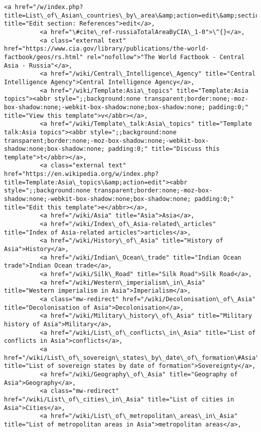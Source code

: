 \documentclass[11pt]{article}
\begin{document}
\begin{Verbatim}[commandchars=\\\{\}]
          <a href="/w/index.php?title=List\_of\_Asian\_countries\_by\_area\&amp;action=edit\&amp;section=2" title="Edit section: References">edit</a>,
          <a href="\#cite\_ref-russiaTotalAreaByCIA\_1-0">\^{}</a>,
          <a class="external text" href="https://www.cia.gov/library/publications/the-world-factbook/geos/rs.html" rel="nofollow">"The World Factbook - Central Asia - Russia"</a>,
          <a href="/wiki/Central\_Intelligence\_Agency" title="Central Intelligence Agency">Central Intelligence Agency</a>,
          <a href="/wiki/Template:Asia\_topics" title="Template:Asia topics"><abbr style=";;background:none transparent;border:none;-moz-box-shadow:none;-webkit-box-shadow:none;box-shadow:none; padding:0;" title="View this template">v</abbr></a>,
          <a href="/wiki/Template\_talk:Asia\_topics" title="Template talk:Asia topics"><abbr style=";;background:none transparent;border:none;-moz-box-shadow:none;-webkit-box-shadow:none;box-shadow:none; padding:0;" title="Discuss this template">t</abbr></a>,
          <a class="external text" href="https://en.wikipedia.org/w/index.php?title=Template:Asia\_topics\&amp;action=edit"><abbr style=";;background:none transparent;border:none;-moz-box-shadow:none;-webkit-box-shadow:none;box-shadow:none; padding:0;" title="Edit this template">e</abbr></a>,
          <a href="/wiki/Asia" title="Asia">Asia</a>,
          <a href="/wiki/Index\_of\_Asia-related\_articles" title="Index of Asia-related articles">articles</a>,
          <a href="/wiki/History\_of\_Asia" title="History of Asia">History</a>,
          <a href="/wiki/Indian\_Ocean\_trade" title="Indian Ocean trade">Indian Ocean trade</a>,
          <a href="/wiki/Silk\_Road" title="Silk Road">Silk Road</a>,
          <a href="/wiki/Western\_imperialism\_in\_Asia" title="Western imperialism in Asia">Imperialism</a>,
          <a class="mw-redirect" href="/wiki/Decolonisation\_of\_Asia" title="Decolonisation of Asia">Decolonisation</a>,
          <a href="/wiki/Military\_history\_of\_Asia" title="Military history of Asia">Military</a>,
          <a href="/wiki/List\_of\_conflicts\_in\_Asia" title="List of conflicts in Asia">conflicts</a>,
          <a href="/wiki/List\_of\_sovereign\_states\_by\_date\_of\_formation\#Asia" title="List of sovereign states by date of formation">Sovereignty</a>,
          <a href="/wiki/Geography\_of\_Asia" title="Geography of Asia">Geography</a>,
          <a class="mw-redirect" href="/wiki/List\_of\_cities\_in\_Asia" title="List of cities in Asia">Cities</a>,
          <a href="/wiki/List\_of\_metropolitan\_areas\_in\_Asia" title="List of metropolitan areas in Asia">metropolitan areas</a>,

\end{Verbatim}
\end{document}
